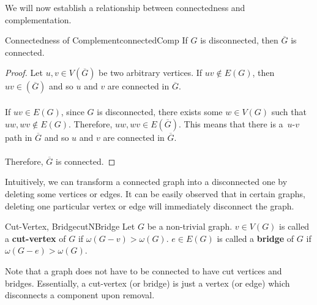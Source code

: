 \documentclass[math]{amznotes}
\theoremstyle{remark}
\begin{document}
We will now establish a relationship between connectedness and complementation.
\begin{thmbox}{Connectedness of Complement}{connectedComp}
    If $G$ is disconnected, then $\overline{G}$ is connected.
    \tcblower
    \begin{proof}
        Let $u, v \in V\left(\overline{G}\right)$ be two arbitrary vertices. If $uv \notin E(G)$, then $uv \in \left(\overline{G}\right)$ and so $u$ and $v$ are connected in $\overline{G}$.
        \\\\
        If $uv \in E(G)$, since $G$ is disconnected, there exists some $w \in V(G)$ such that~$uw, wv \notin E(G)$. Therefore, $uw, wv \in E\left(\overline{G}\right)$. This means that there is a~$u$-$v$ path in $\overline{G}$ and so $u$ and $v$ are connected in $\overline{G}$.
        \\\\
        Therefore, $\overline{G}$ is connected.
    \end{proof}
\end{thmbox}
Intuitively, we can transform a connected graph into a disconnected one by deleting some vertices or edges. It can be easily observed that in certain graphs, deleting one particular vertex or edge will immediately disconnect the graph.
\begin{dfnbox}{Cut-Vertex, Bridge}{cutNBridge}
    Let $G$ be a non-trivial graph. $v \in V(G)$ is called a {\color{red} \textbf{cut-vertex}} of $G$ if $\omega(G - v) > \omega(G)$. $e \in E(G)$ is called a {\color{red} \textbf{bridge}} of $G$ if $\omega(G - e) > \omega(G)$.
\end{dfnbox}
Note that a graph does not have to be connected to have cut vertices and bridges. Essentially, a cut-vertex (or bridge) is just a vertex (or edge) which disconnects a component upon removal.
\end{document}
